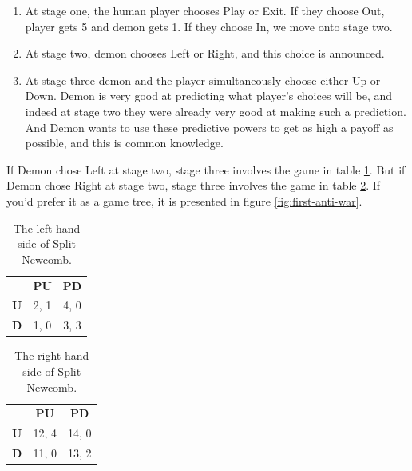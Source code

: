 \documentclass[
  12pt,
]{article}
\providecommand{\tightlist}{%
  \setlength{\itemsep}{0pt}\setlength{\parskip}{0pt}}
\begin{document}
\begin{enumerate}
\def\labelenumi{\arabic{enumi}.}
\tightlist
\item
  At stage one, the human player chooses Play or Exit. If they choose Out, player gets 5 and demon gets 1. If they choose In, we move onto stage two.
\item
  At stage two, demon chooses Left or Right, and this choice is announced.
\item
  At stage three demon and the player simultaneously choose either Up or Down. Demon is very good at predicting what player's choices will be, and indeed at stage two they were already very good at making such a prediction. And Demon wants to use these predictive powers to get as high a payoff as possible, and this is common knowledge.
\end{enumerate}

If Demon chose Left at stage two, stage three involves the game in table \ref{tab:left-anti-war}. But if Demon chose Right at stage two, stage three involves the game in table \ref{tab:right-anti-war}. If you'd prefer it as a game tree, it is presented in figure \ref{fig:first-anti-war}.

\renewcommand{\arraystretch}{1.3}   
\begin{table}

\caption{\label{tab:left-anti-war}The left hand side of Split Newcomb.}
\centering \vspace{6pt}
\begin{tabular}[t]{>{}r>{}c>{}c}

\textbf{} & \textbf{PU} & \textbf{PD}\\

\textbf{U} & 2, 1 & 4, 0\\
\textbf{D} & 1, 0 & 3, 3\\

\end{tabular}
\end{table}

\renewcommand{\arraystretch}{1.3}   
\begin{table}

\caption{\label{tab:right-anti-war}The right hand side of Split Newcomb.}
\centering \vspace{6pt}
\begin{tabular}[t]{>{}r>{}c>{}c}

\textbf{} & \textbf{PU} & \textbf{PD}\\

\textbf{U} & 12, 4 & 14, 0\\
\textbf{D} & 11, 0 & 13, 2\\

\end{tabular}
\end{table}
\end{document}

